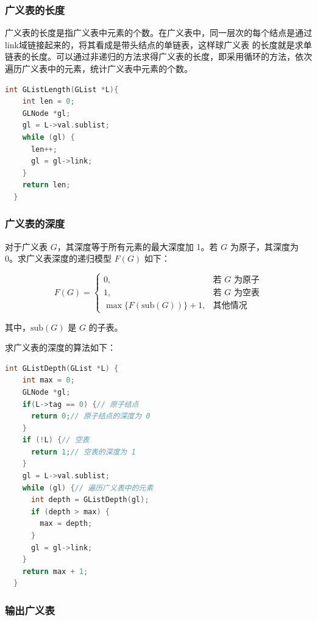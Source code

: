 \documentclass[lang=cn,newtx,10pt,scheme=chinese]{../elegantbook}
\begin{document}
\subsubsection{广义表的长度}

广义表的长度是指广义表中元素的个数。在广义表中，同一层次的每个结点是通过link域链接起来的，将其看成是带头结点的单链表，这样球广义表
的长度就是求单链表的长度。可以通过非递归的方法求得广义表的长度，即采用循环的方法，依次遍历广义表中的元素，统计广义表中元素的个数。

\begin{lstlisting}[language=C++, caption={广义表的长度}]
  int GListLength(GList *L){
    int len = 0;
    GLNode *gl;
    gl = L->val.sublist;
    while (gl) {
      len++;
      gl = gl->link;
    }
    return len;
  }
\end{lstlisting}

\subsubsection{广义表的深度}

对于广义表 $G$，其深度等于所有元素的最大深度加 1。若 $G$ 为原子，其深度为 0。求广义表深度的递归模型 $F(G)$ 如下：

\[
F(G) =
\begin{cases} 
0, & \text{若 } G \text{ 为原子} \\ 
1, & \text{若 } G \text{ 为空表} \\ 
\max \{F(\text{sub}(G))\} + 1, & \text{其他情况}
\end{cases}
\]

其中，$\text{sub}(G)$ 是 $G$ 的子表。

求广义表的深度的算法如下：

\begin{lstlisting}[language=C++, caption={广义表的深度}]
  int GListDepth(GList *L) {
    int max = 0;
    GLNode *gl;
    if(L->tag == 0) {// 原子结点
      return 0;// 原子结点的深度为 0
    }
    if (!L) {// 空表
      return 1;// 空表的深度为 1
    }
    gl = L->val.sublist;
    while (gl) {// 遍历广义表中的元素
      int depth = GListDepth(gl);
      if (depth > max) {
        max = depth;
      }
      gl = gl->link;
    }
    return max + 1;
  }
\end{lstlisting}


\subsubsection{输出广义表}
\end{document}
